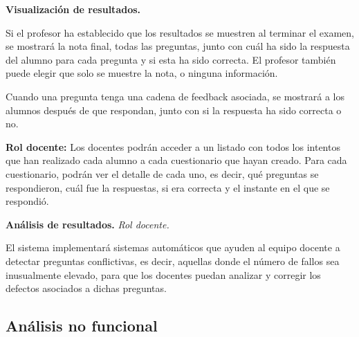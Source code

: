 \begin{rf0}
	\item  \textbf{Visualización de resultados.}
		\begin{rf0*}
			\item Si el profesor ha establecido que los resultados se muestren al terminar el examen, se mostrará la nota final, todas las preguntas, junto con cuál ha sido la respuesta del alumno para cada pregunta y si esta ha sido correcta. El profesor también puede elegir que solo se muestre la nota, o ninguna información.
			\item Cuando una pregunta tenga una cadena de feedback asociada, se mostrará a los alumnos después de que respondan, junto con si la respuesta ha sido correcta o no.\label{RF:feedback}
			\item \textbf{Rol docente:} Los docentes podrán acceder a un listado con todos los intentos que han realizado cada alumno a cada cuestionario que hayan creado. Para cada cuestionario, podrán ver el detalle de cada uno, es decir, qué preguntas se respondieron, cuál fue la respuestas, si era correcta y el instante en el que se respondió.
		\end{rf0*}

	\item  \textbf{Análisis de resultados.} \textit{Rol docente.}
		\begin{rf0*}
			\item El sistema implementará sistemas automáticos que ayuden al equipo docente a detectar preguntas conflictivas, es decir, aquellas donde el número de fallos sea inusualmente elevado, para que los docentes puedan analizar y corregir los defectos asociados a dichas preguntas.
		\end{rf0*}
\end{rf0}


\subsection{Análisis no funcional}

